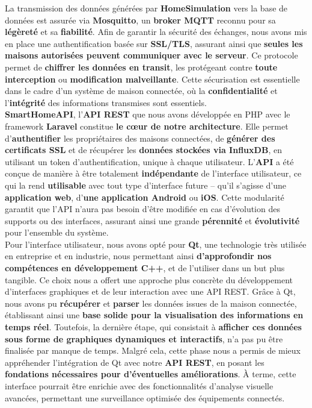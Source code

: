 \documentclass[10pt, a4paper]{report}
\begin{document}
	La transmission des données générées par \textbf{HomeSimulation} vers la base de données est assurée via \textbf{Mosquitto}, un \textbf{broker MQTT} reconnu pour sa \textbf{légèreté} et sa \textbf{fiabilité}. Afin de garantir la sécurité des échanges, nous avons mis en place une authentification basée sur \textbf{SSL/TLS}, assurant ainsi que \textbf{seules les maisons autorisées peuvent communiquer avec le serveur}. Ce protocole permet de \textbf{chiffrer les données en transit}, les protégeant contre \textbf{toute interception} ou \textbf{modification malveillante}. Cette sécurisation est essentielle dans le cadre d’un système de maison connectée, où la \textbf{confidentialité} et l’\textbf{intégrité} des informations transmises sont essentiels.\\
	
	\textbf{SmartHomeAPI}, l'\textbf{API REST} que nous avons développée en PHP avec le framework \textbf{Laravel} constitue \textbf{le cœur de notre architecture}. Elle permet d'\textbf{authentifier} les propriétaires des maisons connectées, de \textbf{générer des certificats SSL} et de récupérer les \textbf{données stockées via InfluxDB}, en utilisant un token d'authentification, unique à chaque utilisateur. L'\textbf{API} a été conçue de manière à être totalement \textbf{indépendante} de l'interface utilisateur, ce qui la rend \textbf{utilisable} avec tout type d'interface future – qu'il s'agisse d'une \textbf{application web}, d'\textbf{une application Android} ou \textbf{iOS}. Cette modularité garantit que l’API n’aura pas besoin d'être modifiée en cas d’évolution des supports ou des interfaces, assurant ainsi une grande \textbf{pérennité} et \textbf{évolutivité} pour l'ensemble du système.\\
	
	Pour l’interface utilisateur, nous avons opté pour \textbf{Qt}, une technologie très utilisée en entreprise et en industrie, nous permettant ainsi \textbf{d’approfondir nos compétences en développement C++}, et de l'utiliser dans un but plus tangible. Ce choix nous a offert une approche plus concrète du développement d’interfaces graphiques et de leur interaction avec une API REST.	
	Grâce à Qt, nous avons pu \textbf{récupérer} et \textbf{parser} les données issues de la maison connectée, établissant ainsi une \textbf{base solide pour la visualisation des informations en temps réel}. Toutefois, la dernière étape, qui consistait à \textbf{afficher ces données sous forme de graphiques dynamiques et interactifs}, n’a pas pu être finalisée par manque de temps.
	Malgré cela, cette phase nous a permis de mieux appréhender l’intégration de Qt avec notre \textbf{API REST}, en posant les \textbf{fondations nécessaires pour d’éventuelles améliorations}. À terme, cette interface pourrait être enrichie avec des fonctionnalités d’analyse visuelle avancées, permettant une surveillance optimisée des équipements connectés.
	
\end{document}
